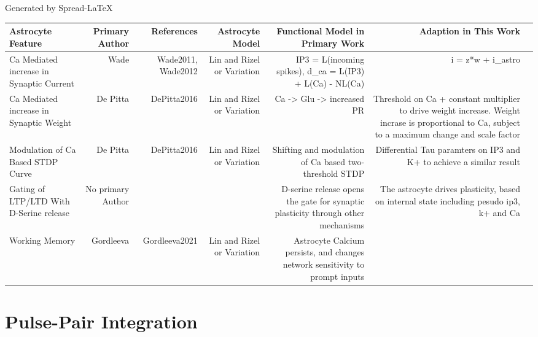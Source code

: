 \begin{adjustwidth}{-2.5 cm}{-2.5 cm}\centering\begin{threeparttable}[!htb]
\caption{Generated by Spread-LaTeX}\label{table:obj2_astro_features}
\scriptsize
\begin{tabular}{lrrrrrr}\toprule
Astrocyte Feature &Primary Author &References &Astrocyte Model &Functional Model in Primary Work &Adaption in This Work \\\midrule
Ca Mediated increase in Synaptic Current &Wade &Wade2011, Wade2012 &Lin and Rizel or Variation &IP3 = L(incoming spikes), d\_ca = L(IP3) + L(Ca) - NL(Ca) &i = z*w + i\_astro \\
Ca Mediated increase in Synaptic Weight &De Pitta &DePitta2016 &Lin and Rizel or Variation &Ca -> Glu -> increased PR &Threshold on Ca + constant multiplier to drive weight increase. Weight incrase is proportional to Ca, subject to a maximum change and scale factor \\
Modulation of Ca Based STDP Curve &De Pitta &DePitta2016 &Lin and Rizel or Variation &Shifting and modulation of Ca based two-threshold STDP &Differential Tau paramters on IP3 and K+ to achieve a similar result \\
Gating of LTP/LTD With D-Serine release &No primary Author & & &D-serine release opens the gate for synaptic plasticity through other mechanisms &The astrocyte drives plasticity, based on internal state including pesudo ip3, k+ and Ca \\
Working Memory &Gordleeva &Gordleeva2021 &Lin and Rizel or Variation &Astrocyte Calcium persists, and changes network sensitivity to prompt inputs & \\
\bottomrule
\end{tabular}
\end{threeparttable}\end{adjustwidth}


\section{Pulse-Pair Integration}

